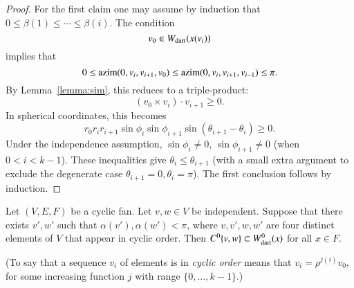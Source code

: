\begin{proof}
For the first claim one may assume by induction that $0\le \beta(1)\le\cdots\le \beta(i)$.  The condition
$$
v_0\in W_{\text{dart}}(x(v_i))
$$
implies that
$$
0 \le {\operatorname{azim}}(0,v_i,v_{i+1},v_0)\le {\operatorname{azim}}(0,v_i,v_{i+1},v_{i-1})\le\pi.
$$
By Lemma~\ref{lemma:sim}, this
reduces to a triple-product:
$$
(v_0 \times v_i)\cdot v_{i+1}\ge 0.
$$
In spherical coordinates, this becomes
$$
r_0r_ir_{i+1}\sin\phi_i\sin\phi_{i+1}\sin(\theta_{i+1}-\theta_i)\ge0.
$$
Under the independence assumption, $\sin\phi_i\ne0$, $\sin\phi_{i+1}\ne0$ (when $0< i < k-1$).    These inequalities give $\theta_i\le\theta_{i+1}$ (with a small extra argument to exclude the degenerate case $\theta_{i+1}=0,\theta_i=\pi$).  The first conclusion follows by induction.
%
\end{proof}

\begin{lemma}  
Let $(V,E,F)$ be a cyclic fan. 
Let $v,w\in V$ be independent.  Suppose that there exists $v',w'$ such
that $\alpha(v'),\alpha(w')<\pi$, where $v,v',w,w'$ are four distinct elements of
$V$ that appear in cyclic order.
Then $C^0\{v,w\}\subset W^0_{\text{dart}}(x)$ for all $x\in F$.
\end{lemma}

(To say that a sequence $v_i$ of elements is in {\it cyclic order} means that
$v_i = \rho^{j (i)}v_0$, for some increasing function $j$ with range $\{0,\ldots,k-1\}$.)

